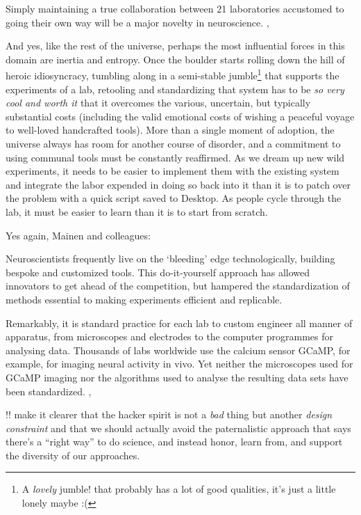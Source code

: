 \documentclass{article}
\begin{document}
\begin{leftbar}
Simply maintaining a true collaboration between 21 laboratories
accustomed to going their own way will be a major novelty in
neuroscience. \cite{abbottInternationalLaboratorySystems2017},\end{leftbar}
And yes, like the rest of the universe, perhaps the most influential
forces in this domain are inertia and entropy. Once the boulder starts
rolling down the hill of heroic idiosyncracy, tumbling along in a
semi-stable jumble\footnote{A \emph{lovely} jumble! that probably has a
  lot of good qualities, it's just a little lonely maybe :(} that
supports the experiments of a lab, retooling and standardizing that
system has to be \emph{so very cool and worth it} that it overcomes the
various, uncertain, but typically substantial costs (including the valid
emotional costs of wishing a peaceful voyage to well-loved handcrafted
tools). More than a single moment of adoption, the universe always has
room for another course of disorder, and a commitment to using communal
tools must be constantly reaffirmed. As we dream up new wild
experiments, it needs to be easier to implement them with the existing
system and integrate the labor expended in doing so back into it than it
is to patch over the problem with a quick script saved to Desktop. As
people cycle through the lab, it must be easier to learn than it is to
start from scratch.

Yes again, Mainen and colleagues:

\begin{leftbar}
Neuroscientists frequently live on the `bleeding' edge technologically,
building bespoke and customized tools. This do-it-yourself approach has
allowed innovators to get ahead of the competition, but hampered the
standardization of methods essential to making experiments efficient and
replicable.

Remarkably, it is standard practice for each lab to custom engineer all
manner of apparatus, from microscopes and electrodes to the computer
programmes for analysing data. Thousands of labs worldwide use the
calcium sensor GCaMP, for example, for imaging neural activity in vivo.
Yet neither the microscopes used for GCaMP imaging nor the algorithms
used to analyse the resulting data sets have been standardized. \cite{mainenBetterWayCrack2016},\end{leftbar}
!! make it clearer that the hacker spirit is not a \emph{bad} thing but
another \emph{design constraint} and that we should actually avoid the
paternalistic approach that says there's a ``right way'' to do science,
and instead honor, learn from, and support the diversity of our
approaches.
\end{document}
